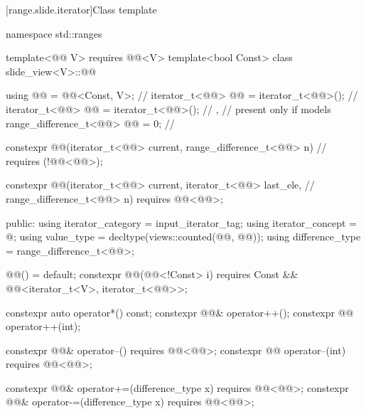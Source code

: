 [range.slide.iterator]{Class template }

%
\begin{codeblock}
namespace std::ranges {
  template<@@ V>
    requires @@<V>
  template<bool Const>
  class slide_view<V>::@@ {
    using @@ = @@<Const, V>;                 // \expos
    iterator_t<@@> @@   = iterator_t<@@>();   // \expos
    iterator_t<@@> @@  = iterator_t<@@>();   // \expos,
                                               // present only if  models 
    range_difference_t<@@> @@ = 0;                    // \expos

    constexpr @@(iterator_t<@@> current, range_difference_t<@@> n) // \expos
      requires (!@@<@@>);

    constexpr @@(iterator_t<@@> current, iterator_t<@@> last_ele,  // \expos
                       range_difference_t<@@> n)
      requires @@<@@>;

  public:
    using iterator_category = input_iterator_tag;
    using iterator_concept = @\seebelow@;
    using value_type = decltype(views::counted(@@, @@));
    using difference_type = range_difference_t<@@>;

    @@() = default;
    constexpr @@(@@<!Const> i)
      requires Const && @@<iterator_t<V>, iterator_t<@@>>;

    constexpr auto operator*() const;
    constexpr @@& operator++();
    constexpr @@ operator++(int);

    constexpr @@& operator--() requires @@<@@>;
    constexpr @@ operator--(int) requires @@<@@>;

    constexpr @@& operator+=(difference_type x)
      requires @@<@@>;
    constexpr @@& operator-=(difference_type x)
      requires @@<@@>;

}}
\end{codeblock}
